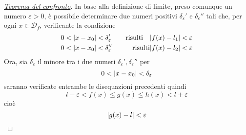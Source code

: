 \begin{proof}[\protect\hyperlink{teor:confLim}{Teorema del confronto}]
  In base alla definizione di limite, preso comunque un numero $\varepsilon>0$, è possibile 
  determinare due numeri positivi $\delta_\varepsilon'$ e $\delta_\varepsilon''$ tali che, per ogni
  $x\in\mathscr{D}_f$, verificante la condizione
  \begin{alignat*}{2}
    0&<\lvert x-x_0\rvert<\delta_\varepsilon' &\quad\text{risulti}\quad \lvert f(x)-l_1\rvert<\varepsilon\\
    0&<\lvert x-x_0\rvert<\delta_\varepsilon'' &\text{risulti} \lvert f(x)-l_2\rvert<\varepsilon\\
  \end{alignat*}
  Ora, sia $\delta_\varepsilon$ il minore tra i due numeri $\delta_\varepsilon',\delta_\varepsilon''$
  per
  \begin{equation*}
    0<\lvert x-x_0\rvert<\delta_\varepsilon
  \end{equation*}
  saranno verificate entrambe le disequazioni precedenti quindi
  \begin{equation*}
    l-\varepsilon<f(x)\leq g(x)\leq h(x)<l+\varepsilon
  \end{equation*}
  cioè
  \begin{equation*}
    \lvert g(x)-l\rvert<\varepsilon
  \end{equation*}
\end{proof}

